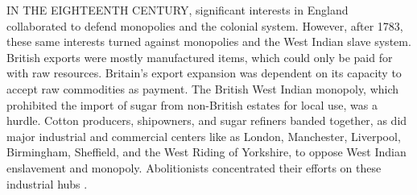 IN THE EIGHTEENTH CENTURY, significant interests in England collaborated to defend monopolies and the colonial system. However, after 1783, these same interests turned against monopolies and the West Indian slave system. British exports were mostly manufactured items, which could only be paid for with raw resources. Britain's export expansion was dependent on its capacity to accept raw commodities as payment. The British West Indian monopoly, which prohibited the import of sugar from non-British estates for local use, was a hurdle. Cotton producers, shipowners, and sugar refiners banded together, as did major industrial and commercial centers like as London, Manchester, Liverpool, Birmingham, Sheffield, and the West Riding of Yorkshire, to oppose West Indian enslavement and monopoly. Abolitionists concentrated their efforts on these industrial hubs .
